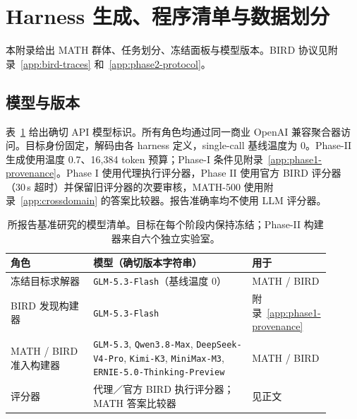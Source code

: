 \section{Harness 生成、程序清单与数据划分}\label{app:inventory}
本附录给出 MATH 群体、任务划分、冻结面板与模型版本。BIRD 协议见附录~\ref{app:bird-traces} 和~\ref{app:phase2-protocol}。


\FloatBarrier

\FloatBarrier
\subsection{模型与版本}\label{app:models}

表~\ref{tab:models} 给出确切 API 模型标识。所有角色均通过同一商业 OpenAI 兼容聚合器访问。目标身份固定，解码由各 harness 定义，single-call 基线温度为 $0$。Phase-II 生成使用温度 0.7、16{,}384 token 预算；Phase-I 条件见附录~\ref{app:phase1-provenance}。Phase I 使用代理执行评分器，Phase II 使用官方 BIRD 评分器（30\,s 超时）并保留旧评分器的次要审核，MATH-500 使用附录~\ref{app:crossdomain} 的答案比较器。报告准确率均不使用 LLM 评分器。

\begin{table}[H]
\centering
\small
\begin{tabular}{p{0.26\linewidth}p{0.50\linewidth}p{0.14\linewidth}}
\toprule
角色 & 模型（确切版本字符串） & 用于 \\
\midrule
冻结目标求解器 & \texttt{GLM-5.3-Flash}（基线温度 $0$） & MATH / BIRD \\
BIRD 发现构建器 & \texttt{GLM-5.3-Flash} & 附录~\ref{app:phase1-provenance} \\
MATH / BIRD 准入构建器 & \texttt{GLM-5.3}, \texttt{Qwen3.8-Max},
\texttt{DeepSeek-V4-Pro}, \texttt{Kimi-K3}, \texttt{MiniMax-M3},
\texttt{ERNIE-5.0-Thinking-Preview} & MATH / BIRD \\
评分器 & 代理／官方 BIRD 执行评分器；MATH 答案比较器 & 见正文 \\
\bottomrule
\end{tabular}
\caption{所报告基准研究的模型清单。目标在每个阶段内保持冻结；Phase-II 构建器来自六个独立实验室。}
\label{tab:models}
\end{table}
